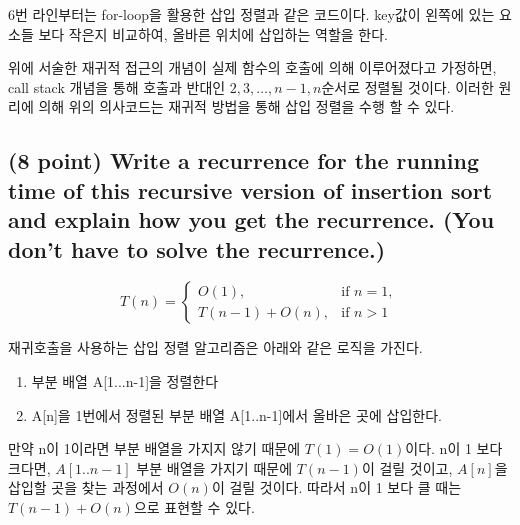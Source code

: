 \documentclass{article}
\begin{document}
6번 라인부터는 for-loop을 활용한 삽입 정렬과 같은 코드이다. key값이 왼쪽에 있는 요소들 보다 작은지 비교하여, 올바른 위치에
삽입하는 역할을 한다.


위에 서술한 재귀적 접근의 개념이 실제 함수의 호출에 의해 이루어졌다고 가정하면, call stack 개념을 통해
호출과 반대인 $2, 3, \dots , n-1, n$순서로 정렬될 것이다. 이러한 원리에 의해 위의 의사코드는 재귀적 방법을 통해 삽입 정렬을
수행 할 수 있다.

\subsection{(8 point) Write a recurrence for the running time of this recursive version of insertion
sort and explain how you get the recurrence. (You don’t have to solve the recurrence.)}

\begin{equation*}
    T(n) = \begin{cases}
    O(1), &\text{if $n = 1$},\\
    T(n-1)+ O(n), &\text{if $n > 1$}
    \end{cases}
\end{equation*}

재귀호출을 사용하는 삽입 정렬 알고리즘은 아래와 같은 로직을 가진다.
\begin{enumerate}
    \item 부분 배열 A[1...n-1]을 정렬한다
    \item A[n]을 1번에서 정렬된 부분 배열 A[1..n-1]에서 올바은 곳에 삽입한다.
\end{enumerate}

만약 n이 1이라면 부분 배열을 가지지 않기 때문에 $T(1) = O(1)$이다.
n이 1 보다 크다면, $A[1..n-1]$ 부분 배열을 가지기 때문에 $T(n-1)$이 걸릴 것이고, $A[n]$을 삽입할 곳을 찾는 과정에서 $O(n)$이 걸릴 것이다.
따라서 n이 1 보다 클 때는 $T(n-1) + O(n)$으로 표현할 수 있다.
\end{document}
